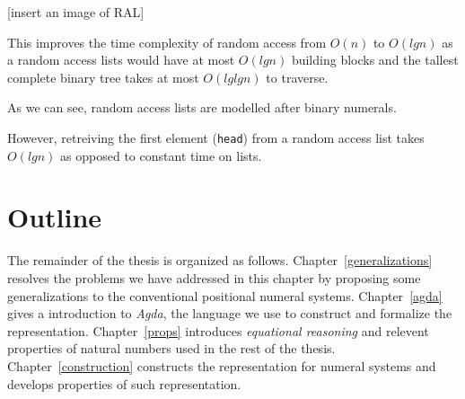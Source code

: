 \documentclass[../thesis.tex]{subfiles}
\begin{document}
[insert an image of RAL]

This improves the time complexity of random access from $ O(n) $ to $ O(lg n) $
as a random access lists would have at most $ O(lg n) $ building blocks and
the tallest complete binary tree takes at most $ O(lglg n) $ to traverse.

As we can see, random access lists are modelled after binary numerals.


However, retreiving the first element ({\lstinline|head|}) from a random
access list takes $ O(lg n) $ as opposed to constant time on lists.


%
%
%


\section{Outline}
The remainder of the thesis is organized as follows.
Chapter~\ref{generalizations} resolves the problems we have addressed in this chapter
by proposing some generalizations to the conventional positional numeral systems.
Chapter~\ref{agda} gives a introduction to \textit{Agda}, the language we use to
construct and formalize the representation.
Chapter~\ref{props} introduces \textit{equational reasoning} and relevent properties
of natural numbers used in the rest of the thesis.
Chapter~\ref{construction} constructs the representation for numeral systems and
develops properties of such representation.

%
%
\end{document}
